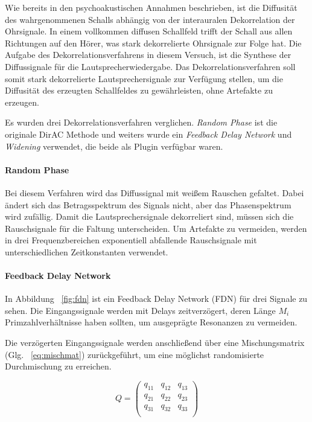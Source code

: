 Wie bereits in den psychoakustischen Annahmen beschrieben, ist die Diffusität des wahrgenommenen Schalls abhängig von der interauralen Dekorrelation der Ohrsignale. In einem vollkommen diffusen Schallfeld trifft der Schall aus allen Richtungen auf den Hörer, was stark dekorrelierte Ohrsignale zur Folge hat. Die Aufgabe des Dekorrelationsverfahrens in diesem Versuch, ist die Synthese der Diffussignale für die Lautsprecherwiedergabe. Das Dekorrelationsverfahren soll somit stark dekorrelierte Lautsprechersignale zur Verfügung stellen, um die Diffusität des erzeugten Schallfeldes zu gewährleisten, ohne Artefakte zu erzeugen.

Es wurden drei Dekorrelationsverfahren verglichen. \textit{Random Phase} ist die originale DirAC Methode und weiters wurde ein \textit{Feedback Delay Network} und \textit{Widening} verwendet, die beide als Plugin verfügbar waren.

\paragraph{Random Phase}
Bei diesem Verfahren wird das Diffussignal mit weißem Rauschen gefaltet. Dabei ändert sich das Betragsspektrum des Signals nicht, aber das Phasenspektrum wird zufällig. Damit die Lautsprechersignale dekorreliert sind, müssen sich die Rauschsignale für die Faltung unterscheiden. Um Artefakte zu vermeiden, werden in drei Frequenzbereichen exponentiell abfallende Rauschsignale mit unterschiedlichen Zeitkonstanten verwendet.

\paragraph{Feedback Delay Network}

In Abbildung ~\ref{fig:fdn} ist ein Feedback Delay Network (FDN) für drei Signale zu sehen. Die Eingangssignale werden mit Delays zeitverzögert, deren Länge $M_i$ Primzahlverhältnisse haben sollten, um ausgeprägte Resonanzen zu vermeiden.

Die verzögerten Eingangssignale werden anschließend über eine Mischungsmatrix (Glg. ~\ref{eq:mischmat}) zurückgeführt, um eine möglichst randomisierte Durchmischung zu erreichen.

\begin{equation}
    Q = 
    \begin{pmatrix}
		q_{11} & q_{12} & q_{13} \\
        q_{21} & q_{22} & q_{23} \\
        q_{31} & q_{32} & q_{33} \\
    \end{pmatrix}
    \label{eq:mischmat}
\end{equation}

